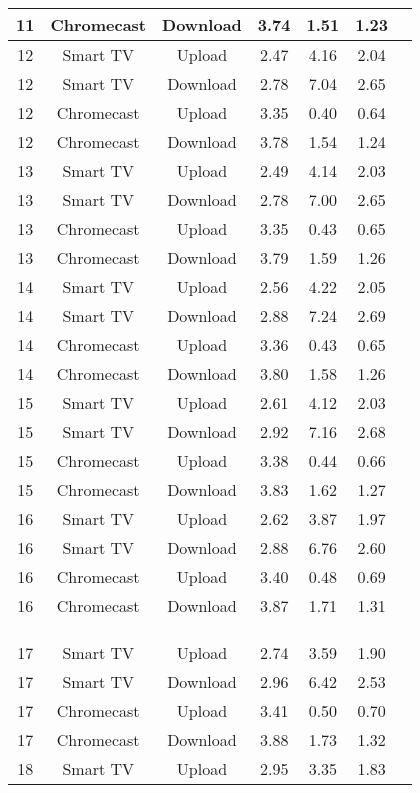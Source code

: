 \begin{longtable}{|c|c|c|c|c|c|c|}
    11 & Chromecast & Download & 3.74 & 1.51 & 1.23 \\
    \hline
    12 & Smart TV & Upload & 2.47 & 4.16 & 2.04 \\
    12 & Smart TV & Download & 2.78 & 7.04 & 2.65 \\
    12 & Chromecast & Upload & 3.35 & 0.40 & 0.64 \\
    12 & Chromecast & Download & 3.78 & 1.54 & 1.24 \\
    \hline
    13 & Smart TV & Upload & 2.49 & 4.14 & 2.03 \\
    13 & Smart TV & Download & 2.78 & 7.00 & 2.65 \\
    13 & Chromecast & Upload & 3.35 & 0.43 & 0.65 \\
    13 & Chromecast & Download & 3.79 & 1.59 & 1.26 \\
    \hline
    14 & Smart TV & Upload & 2.56 & 4.22 & 2.05 \\
    14 & Smart TV & Download & 2.88 & 7.24 & 2.69 \\
    14 & Chromecast & Upload & 3.36 & 0.43 & 0.65 \\
    14 & Chromecast & Download & 3.80 & 1.58 & 1.26 \\
    \hline
    15 & Smart TV & Upload & 2.61 & 4.12 & 2.03 \\
    15 & Smart TV & Download & 2.92 & 7.16 & 2.68 \\
    15 & Chromecast & Upload & 3.38 & 0.44 & 0.66 \\
    15 & Chromecast & Download & 3.83 & 1.62 & 1.27 \\
    \hline
    16 & Smart TV & Upload & 2.62 & 3.87 & 1.97 \\
    16 & Smart TV & Download & 2.88 & 6.76 & 2.60 \\
    16 & Chromecast & Upload & 3.40 & 0.48 & 0.69 \\
    16 & Chromecast & Download & 3.87 & 1.71 & 1.31 \\
    &&&&& \\
    &&&&& \\
    &&&&& \\
    \hline
    17 & Smart TV & Upload & 2.74 & 3.59 & 1.90 \\
    17 & Smart TV & Download & 2.96 & 6.42 & 2.53 \\
    17 & Chromecast & Upload & 3.41 & 0.50 & 0.70 \\
    17 & Chromecast & Download & 3.88 & 1.73 & 1.32 \\
    \hline
    18 & Smart TV & Upload & 2.95 & 3.35 & 1.83 \\

\end{longtable}
